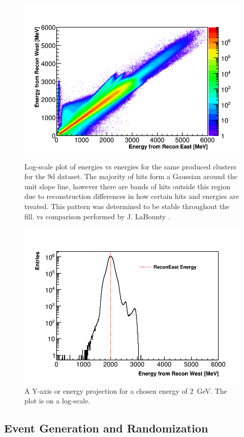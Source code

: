 \begin{figure}
\centering
\includegraphics[width=.7\textwidth]{ReconEastvWest_Energies}
\caption{Log-scale plot of \RE energies vs \RW energies for the same produced clusters for the 9d dataset. The majority of hits form a Gaussian around the unit slope line, however there are bands of hits outside this region due to reconstruction differences in how certain hits and energies are treated. This pattern was determined to be stable throughout the fill. \RE vs \RW comparison performed by J. LaBounty \cite{JoshEvW}.}
\label{fig:EvWenergies}
\end{figure}

\begin{figure}
\centering
\includegraphics[width=.7\textwidth]{ReconEastvWest_Projection}
\caption{A Y-axis or \RW energy projection for a chosen \RE energy of \SI{2}{\GeV}. The plot is on a log-scale.}
\label{fig:EvWprojection}
\end{figure}




\subsection{Event Generation and Randomization}


